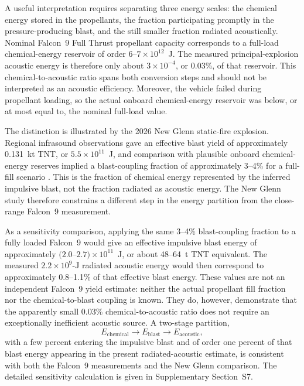 \documentclass[]{seismica}
\begin{document}
A useful interpretation requires separating three energy scales:
the chemical energy stored in the propellants, the fraction participating
promptly in the pressure-producing blast, and the still smaller fraction
radiated acoustically. Nominal Falcon~9 Full Thrust propellant capacity
corresponds to a full-load chemical-energy reservoir of order
$6$--$7\times10^{12}$~J. The measured principal-explosion acoustic energy is
therefore only about $3\times10^{-4}$, or 0.03\%, of that reservoir. This
chemical-to-acoustic ratio spans both conversion steps and should not be
interpreted as an acoustic efficiency. Moreover, the vehicle failed during
propellant loading, so the actual onboard chemical-energy reservoir was below,
or at most equal to, the nominal full-load value.

The distinction is illustrated by the 2026 New Glenn static-fire explosion.
Regional infrasound observations gave an effective blast yield of approximately
0.131~kt TNT, or $5.5\times10^{11}$~J, and comparison with plausible onboard
chemical-energy reserves implied a blast-coupling fraction of approximately
3--4\% for a full-fill scenario
\citep{silber_scamfer_newglenn_2026}. This is the fraction of chemical energy
represented by the inferred impulsive blast, not the fraction radiated as
acoustic energy. The New Glenn study therefore constrains a different step in
the energy partition from the close-range Falcon~9 measurement.

As a sensitivity comparison, applying the same 3--4\% blast-coupling fraction
to a fully loaded Falcon~9 would give an effective impulsive blast energy of
approximately $(2.0$--$2.7)\times10^{11}$~J, or about 48--64~t TNT
equivalent. The measured $2.2\times10^9$-J radiated acoustic energy would then
correspond to approximately 0.8--1.1\% of that effective blast energy. These
values are not an independent Falcon~9 yield estimate: neither the actual
propellant fill fraction nor the chemical-to-blast coupling is known. They do,
however, demonstrate that the apparently small 0.03\% chemical-to-acoustic
ratio does not require an exceptionally inefficient acoustic source. A
two-stage partition,
\[
 E_{\mathrm{chemical}}
 \rightarrow E_{\mathrm{blast}}
 \rightarrow E_{\mathrm{acoustic}},
\]
with a few percent entering the impulsive blast and of order one percent of
that blast energy appearing in the present radiated-acoustic estimate, is
consistent with both the Falcon~9 measurements and the New Glenn comparison.
The detailed sensitivity calculation is given in Supplementary Section~S7.
\end{document}
